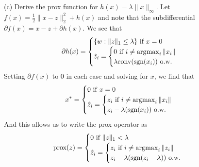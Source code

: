 (c) Derive the prox function for $h(x) = \lambda\|x\|_\infty$.  Let $f(x) =
\frac{1}{2}\|x-z\|_2^2 + h(x)$ and note that the subdifferential $\partial f(x)
= x - z + \partial h(x)$. We see that 
\begin{align*}
    \partial h(x) = 
    \begin{cases}
        \{w : \|z\|_1 \leq \lambda \} \text{ if }  x=0\\
        \hat{z}_i = 
        \begin{cases}
            0 \text{ if }  i\neq \operatorname*{\arg\!\max}_i \|x_i\| \\
            \lambda\text{conv}(\text{sgn}(x_i)) \text{ o.w. }
        \end{cases}
    \end{cases}
\end{align*}
Setting $\partial f(x)$ to 0 in each case and solving for $x$, we find that 
\begin{align*}
    x^* = 
    \begin{cases}
        0 \text{ if }  x=0\\
        \hat{z}_i = 
        \begin{cases}
            z_i \text{ if }  i\neq \operatorname*{\arg\!\max}_i \|x_i\| \\
            z_i - \lambda(\text{sgn}(x_i)) \text{ o.w. }
        \end{cases}
    \end{cases}
\end{align*}
And this allows us to write the prox operator as
\begin{align*}
    \text{prox}(z) = 
    \begin{cases}
        0 \text{ if }  \|z\|_1 < \lambda\\
        \hat{z}_i = 
        \begin{cases}
            z_i \text{ if }  i\neq \operatorname*{\arg\!\max}_i \|z_i\| \\
            z_i - \lambda(\text{sgn}(z_i - \lambda)) \text{ o.w. }
        \end{cases}
    \end{cases}
\end{align*}


